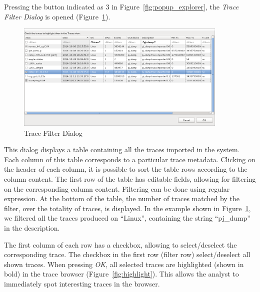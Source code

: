 \documentclass[twoside]{article}
\begin{document}
\begin{sloppypar}
Pressing the button indicated as \num{3} in Figure~\ref{fig:popup_explorer}, the \emph{Trace Filter Dialog} is opened (Figure~\ref{fig:trace_filter_dialog}).

\begin{figure}[h!]
  \centering
    \includegraphics[width=0.9\textwidth]{images/trace_table_filter.png}
  \caption{Trace Filter Dialog}
  \label{fig:trace_filter_dialog}
\end{figure}

This dialog displays a table containing all the traces imported in the system. Each column of this table corresponds to a particular trace metadata. Clicking on the header of each column, it is possible to sort the table rows according to the column content. The first row of the table has editable fields, allowing for filtering on the corresponding column content. Filtering can be done using regular expression. At the bottom of the table, the number of traces matched by the filter, over the totality of traces, is displayed. In the example shown in Figure~\ref{fig:trace_filter_dialog}, we filtered all the traces produced on ``Linux'', containing the string ``pj\_dump'' in the description.

The first column of each row has a checkbox, allowing to select/deselect the corresponding trace. The checkbox in the first row (filter row) select/deselect all shown traces.
When pressing \emph{OK}, all selected traces are highlighted (shown in bold) in the trace browser (Figure~\ref{fig:highlight}). This allows the analyst to immediately spot interesting traces in the browser.


\end{sloppypar}
\end{document}
